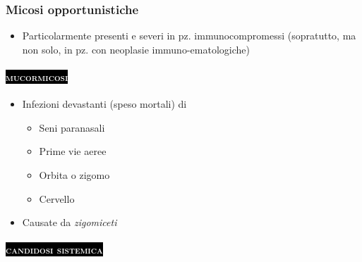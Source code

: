 \documentclass[italian,]{article}
\providecommand{\tightlist}{%
  \setlength{\itemsep}{0pt}\setlength{\parskip}{0pt}}
\newcommand{\pat}[1]{\colorbox{black}{\textcolor{white}{\textsc{#1}}}}
\begin{document}
\hypertarget{micosi-opportunistiche}{%
\subsubsection{Micosi opportunistiche}\label{micosi-opportunistiche}}

\begin{itemize}
\tightlist
\item
  Particolarmente presenti e severi in pz. immunocompromessi
  (sopratutto, ma non solo, in pz. con neoplasie immuno-ematologiche)
\end{itemize}

\hypertarget{section-5}{%
\paragraph{\texorpdfstring{\pat{mucormicosi}}{}}\label{section-5}}

\begin{itemize}
\tightlist
\item
  Infezioni devastanti (speso mortali) di

  \begin{itemize}
  \tightlist
  \item
    Seni paranasali
  \item
    Prime vie aeree
  \item
    Orbita o zigomo
  \item
    Cervello
  \end{itemize}
\item
  Causate da \emph{zigomiceti}
\end{itemize}

\hypertarget{section-6}{%
\paragraph{\texorpdfstring{\pat{candidosi sistemica}}{}}\label{section-6}}
\end{document}
